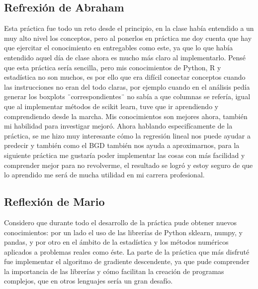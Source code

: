 \documentclass[sigconf,authorversion,nonacm]{acmart}
\begin{document}
\subsection{Refrexión de Abraham}
Esta práctica fue todo un reto desde el principio, en la clase había entendido a un muy alto nivel los conceptos, pero al ponerlos en práctica me doy cuenta que hay que ejercitar el conocimiento en entregables como este, ya que lo que había entendido aquel día de clase ahora es mucho más claro al implementarlo. Pensé que esta práctica sería sencilla, pero mis conocimientos de Python, R y estadística no son muchos, es por ello que era difícil conectar conceptos cuando las instrucciones no eran del todo claras, por ejemplo cuando en el análisis pedía generar los boxplots ¨correspondientes¨ no sabía a que columnas se refería, igual que al implementar métodos de scikit learn, tuve que ir aprendiendo y comprendiendo desde la marcha. Mis conocimientos son mejores ahora, también mi habilidad para investigar mejoró. Ahora hablando especifícamente de la práctica, se me hizo muy interesante cómo la regresión lineal nos puede ayudar a predecir y también como el BGD también nos ayuda a aproximarnos, para la siguiente práctica me gustaría poder implementar las cosas con más facilidad y comprender mejor para no revolverme, el resultado se logró y estoy seguro de que lo aprendido me será de mucha utilidad en mi carrera profesional.

\subsection{Reflexión de Mario}
Considero que durante todo el desarrollo de la práctica pude obtener nuevos conocimientos: por un lado el uso de las librerías de Python sklearn, numpy, y pandas, y por otro en el ámbito de la estadística y los métodos numéricos aplicados a problemas reales como éste. La parte de la práctica que más disfruté fue implementar el algoritmo de gradiente descendente, ya que pude comprender la importancia de las librerías y cómo facilitan la creación de programas complejos, que en otros lenguajes sería un gran desafío.





\clearpage

\appendix
\end{document}
